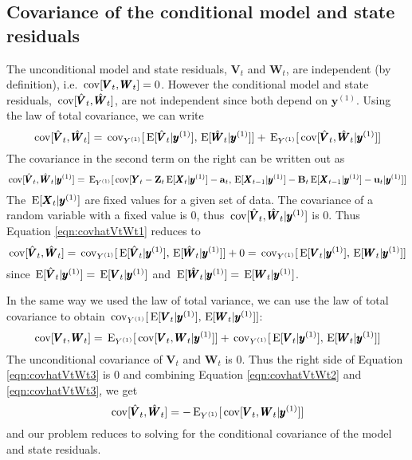 \documentclass[]{article}
\def\UPS{\mbox{\boldmath $\Upsilon$}}
\def\XI{\mbox{\boldmath $\Xi$}}
\def\BB{\mbox{$\mathbf B$}}	\def\bb{\mbox{$\mathbf b$}} \def\Bb{\mbox{$\mathbf J$}} \def\Ba{\mbox{$\mathbf L$}} \def\Bm{\UPS}
\def\E{\,\textup{\textrm{E}}}
\def\VV{\mbox{$\pmb{V}$}}	\def\vv{\mbox{$\pmb{v}$}}
\def\WW{\mbox{$\pmb{W}$}}	\def\ww{\mbox{$\pmb{w}$}}
\def\XX{\mbox{$\pmb{X}$}}	\def\xx{\mbox{$\pmb{x}$}}
\def\YY{\mbox{$\pmb{Y}$}}	\def\yy{\mbox{$\pmb{y}$}}
\def\ZZ{\mbox{$\mathbf Z$}}	\def\zz{\mbox{$\mathbf z$}}	\def\Zb{\mbox{$\mathbf M$}} \def\Za{\mbox{$\mathbf N$}} \def\Zm{\XI}
\def\cov{\,\textup{\textrm{cov}}}
\begin{document}
\subsection{Covariance of the conditional model and state residuals}
The unconditional model and state residuals, $\VV_t$ and $\WW_t$, are independent (by definition), i.e. $\cov[\VV_t,\WW_t]=0$.  However the conditional model and state residuals, $\cov[\hat{\VV}_t,\hat{\WW}_t]$, are not independent since both depend on $\yy^{(1)}$.  
Using the law of total covariance, we can write
\begin{equation}\label{eqn:covhatVtWt1}
\cov[\hat{\VV}_t,\hat{\WW}_t] = 
\cov_{Y^{(1)}}[\E[\hat{\VV}_t|\yy^{(1)}],\E[\hat{\WW}_t|\yy^{(1)}]] + \E_{Y^{(1)}}[\cov[\hat{\VV}_t, \hat{\WW}_t|\yy^{(1)}]]
\end{equation}
The covariance in the second term on the right can be written out as
\begin{equation}
\cov[\hat{\VV}_t, \hat{\WW}_t|\yy^{(1)}] =  \E_{Y^{(1)}}[\cov[\YY_t-\ZZ_t\E[\XX_t|\yy^{(1)}]-\aa_t, \E[\XX_{t-1}|\yy^{(1)}]-\BB_t\E[\XX_{t-1}|\yy^{(1)}]-\uu_t|\yy^{(1)}]]
\end{equation}
The $\E[\XX_t|\yy^{(1)}]$ are fixed values for a given set of data. The covariance of a random variable with a fixed value is 0, thus $\cov[\hat{\VV}_t, \hat{\WW}_t|\yy^{(1)}]$ is 0.  Thus Equation \ref{eqn:covhatVtWt1} reduces to
\begin{equation}\label{eqn:covhatVtWt2}
\cov[\hat{\VV}_t,\hat{\WW}_t] = \cov_{Y^{(1)}}[\E[\hat{\VV}_t|\yy^{(1)}],\E[\hat{\WW}_t|\yy^{(1)}]] + 0 = \cov_{Y^{(1)}}[\E[\VV_t|\yy^{(1)}],\E[\WW_t|\yy^{(1)}]]
\end{equation}
since $\E[\hat{\VV}_t|\yy^{(1)}]=\E[\VV_t|\yy^{(1)}]$ and $\E[\hat{\WW}_t|\yy^{(1)}]=\E[\WW_t|\yy^{(1)}]$.

In the same way we used the law of total variance, we can use the law of total covariance  to obtain $\cov_{Y^{(1)}}[\E[\VV_t|\yy^{(1)}],\E[\WW_t|\yy^{(1)}]]$:
\begin{equation}\label{eqn:covhatVtWt3}
\cov[\VV_t, \WW_t] = \E_{Y^{(1)}}[\cov[\VV_t, \WW_t|\yy^{(1)}]] + \cov_{Y^{(1)}}[\E[\VV_t|\yy^{(1)}],\E[\WW_t|\yy^{(1)}]]\\ 
\end{equation}
The unconditional covariance of $\VV_t$ and $\WW_t$ is 0. Thus the right side of Equation \ref{eqn:covhatVtWt3} is 0 and combining Equation \ref{eqn:covhatVtWt2} and \ref{eqn:covhatVtWt3}, we get
\begin{equation}\label{eqn:conditionalcovvtwt}
\cov[\hat{\VV}_t,\hat{\WW}_t] = - \E_{Y^{(1)}}[ \cov[\VV_t, \WW_t|\yy^{(1)}] ] 
\end{equation}
and our problem reduces to solving for the conditional covariance of the model and state residuals.  
\end{document}
